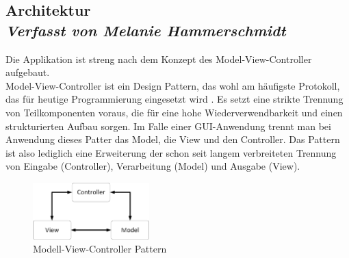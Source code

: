 \newpage
\subsection[Architektur]{Architektur \label{sec:Architektur}
 \\ \textnormal{\small{\textit {Verfasst von Melanie Hammerschmidt}}}}
 
Die Applikation ist streng nach dem Konzept des Model-View-Controller aufgebaut.
\\
Model-View-Controller ist ein Design Pattern, das wohl am häufigste Protokoll, das für heutige Programmierung eingesetzt wird \cite{MVC}. Es setzt eine strikte Trennung von Teilkomponenten voraus, die für eine hohe Wiederverwendbarkeit und einen strukturierten Aufbau sorgen. Im Falle einer GUI-Anwendung trennt man bei Anwendung dieses Patter das Model, die View und den Controller. Das Pattern ist also lediglich eine Erweiterung der schon seit langem verbreiteten Trennung von Eingabe (Controller), Verarbeitung (Model) und Ausgabe (View). 

\begin{figure}[h]
\centering
\includegraphics[width=0.4\textwidth]{ref/images/mvc.png}
\caption[Modell-View-Controller Pattern]{Modell-View-Controller Pattern}
\label{fig:MVC}
\end{figure} 

